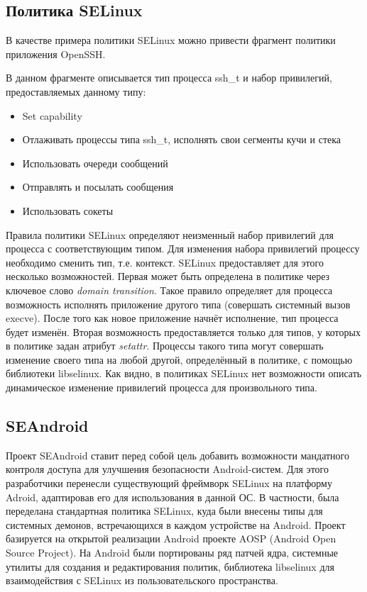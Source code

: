 \subsection{Политика SELinux} 

В качестве примера политики SELinux можно привести
фрагмент политики приложения OpenSSH.


В данном фрагменте описывается тип процесса ssh\_t и
набор привилегий, предоставляемых данному типу:
\begin{itemize}
\item Set capability
\item Отлаживать процессы типа ssh\_t, исполнять свои сегменты
        кучи и стека
\item Использовать очереди сообщений
\item Отправлять и посылать сообщения
\item Использовать сокеты
\end{itemize}

Правила политики SELinux определяют неизменный набор привилегий для
процесса с соответствующим типом. Для изменения набора привилегий
процессу необходимо сменить тип, т.е. контекст. SELinux предоставляет
для этого несколько возможностей. Первая может быть определена в
политике через ключевое слово \emph{domain transition}. Такое правило
определяет для процесса возможность исполнять приложение другого типа
(совершать системный вызов execve). После того как новое приложение
начнёт исполнение, тип процесса будет изменён. Вторая возможность
предоставляется только для типов, у которых в политике задан атрибут
\emph{setattr}. Процессы такого типа могут совершать изменение своего типа на
любой другой, определённый в политике, с помощью библиотеки libselinux.
Как видно, в политиках SELinux нет возможности описать динамическое
изменение привилегий процесса для произвольного типа.

\subsection{SEAndroid}

Проект SEAndroid ставит перед собой цель добавить возможности мандатного
контроля доступа для улучшения безопасности Android-систем. Для этого
разработчики перенесли существующий фреймворк SELinux на платформу
Adroid, адаптировав его для использования в данной ОС. В частности, была
переделана стандартная политика SELinux, куда были внесены типы для
системных демонов, встречающихся в каждом устройстве на Android. Проект
базируется на открытой реализации Android проекте AOSP (Android Open
Source Project). На Android были портированы ряд патчей ядра, системные
утилиты для создания и редактирования политик, библиотека libselinux для
взаимодействия с SELinux из пользовательского пространства. 

